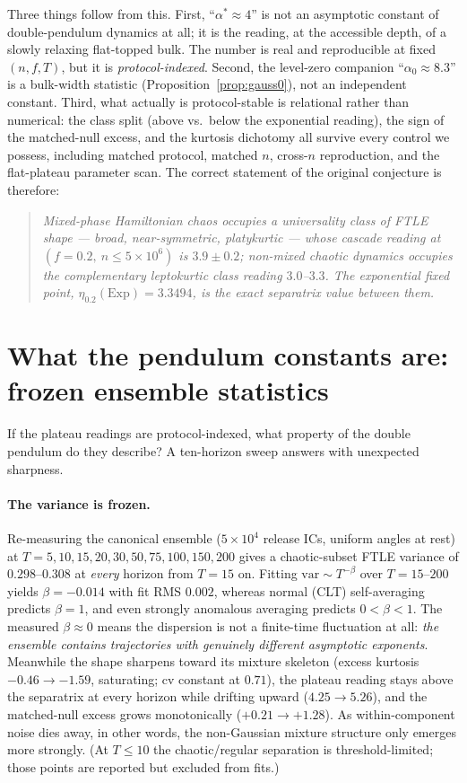 \documentclass[11pt,a4paper]{article}
\theoremstyle{remark}
\newcommand{\Exp}{\mathrm{Exp}}
\newcommand{\cv}{\mathrm{cv}}
\begin{document}
Three things follow from this. First, ``$\alpha^* \approx 4$'' is not an asymptotic constant of
double-pendulum dynamics at all; it is the reading, at the accessible depth, of a slowly relaxing
flat-topped bulk. The number is real and reproducible at fixed $(n, f, T)$, but it is
\emph{protocol-indexed}. Second, the level-zero companion ``$\alpha_0 \approx 8.3$'' is a bulk-width
statistic (Proposition~\ref{prop:gauss0}), not an independent constant. Third, what actually is
protocol-stable is relational rather than numerical: the class split (above vs.\ below the
exponential reading), the sign of the matched-null excess, and the kurtosis dichotomy all survive
every control we possess, including matched protocol, matched $n$, cross-$n$ reproduction, and the
flat-plateau parameter scan. The correct statement of the original conjecture is therefore:
\begin{quote}\itshape
Mixed-phase Hamiltonian chaos occupies a universality class of FTLE \emph{shape} ---
broad, near-symmetric, platykurtic --- whose cascade reading at $(f{=}0.2,\ n \le 5{\times}10^{6})$
is $3.9 \pm 0.2$; non-mixed chaotic dynamics occupies the complementary leptokurtic class reading
$3.0$--$3.3$. The exponential fixed point, $\eta_{0.2}(\Exp) = 3.3494$, is the exact separatrix
value between them.
\end{quote}

\section{What the pendulum constants are: frozen ensemble statistics}\label{sec:ensemble}

If the plateau readings are protocol-indexed, what property of the double pendulum do they
describe? A ten-horizon sweep answers with unexpected sharpness.

\paragraph{The variance is frozen.} Re-measuring the canonical ensemble ($5\times10^{4}$ release ICs,
uniform angles at rest) at $T = 5, 10, 15, 20, 30, 50, 75, 100, 150, 200$ gives a chaotic-subset FTLE
variance of $0.298$--$0.308$ at \emph{every} horizon from $T = 15$ on. Fitting
$\mathrm{var} \sim T^{-\beta}$ over $T = 15$--$200$ yields $\beta = -0.014$ with fit RMS $0.002$,
whereas normal (CLT) self-averaging predicts $\beta = 1$, and even strongly anomalous averaging
predicts $0 < \beta < 1$. The measured $\beta \approx 0$ means the dispersion is not a finite-time
fluctuation at all: \emph{the ensemble contains trajectories with genuinely different asymptotic
exponents}. Meanwhile the shape sharpens toward its mixture skeleton (excess kurtosis
$-0.46 \to -1.59$, saturating; $\cv$ constant at $0.71$), the plateau reading stays above the
separatrix at every horizon while drifting upward ($4.25 \to 5.26$), and the matched-null excess
grows monotonically ($+0.21 \to +1.28$). As within-component noise dies away, in other words, the
non-Gaussian mixture structure only emerges more strongly. (At $T \le 10$ the chaotic/regular
separation is threshold-limited; those points are reported but excluded from fits.)
\end{document}
